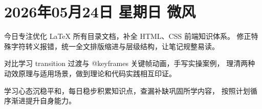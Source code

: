 \section{2026年05月24日 \quad 星期日 \quad 微风}

今日专注优化 LaTeX 所有目录文档，补全 HTML、CSS 前端知识体系。
修正特殊字符转义报错，统一全文排版缩进与层级结构，让笔记规整易读。

对比学习 transition 过渡与 @keyframes 关键帧动画，手写实操案例，
理清两种动效原理与适用场景，做到理论和代码实践相互印证。

学习心态沉稳平和，每日稳步积累知识点，查漏补缺巩固所学内容，
按照计划循序渐进提升自身能力。
